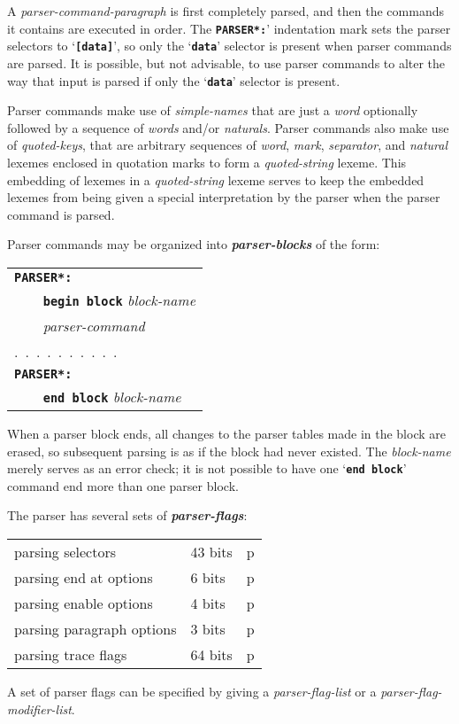 \documentclass[12pt]{article}
\makeatletter
\newcommand{\TT}[1]{{\tt \bfseries #1}}
\newcommand{\skey}[2]{{\bf \em #1#2}\index{#1}}
\newcommand{\emkey}[1]{{\bf \em #1}\index{#1@{\em #1}}}
\newcommand{\pagref}[1]{p\pageref{#1}}
\makeatother
\begin{document}
A {\em parser-command-paragraph} is first completely parsed, and then
the commands it contains are executed in order.
The \TT{*PARSER*:}' indentation mark sets the parser selectors
to `\TT{[data]}', so only the `\TT{data}' selector is present when
parser commands are parsed.  It is possible, but not advisable, to
use parser commands to alter the way that input is parsed if only
the `\TT{data}' selector is present.

Parser commands make use of {\em simple-names} that are just a {\em word}
optionally followed by a sequence of {\em words} and/or {\em naturals}.
Parser commands also make use of
{\em quoted-keys}, that are arbitrary sequences of {\em word},
{\em mark}, {\em separator}, and {\em natural} lexemes enclosed
in quotation marks to form a {\em quoted-string} lexeme.
This embedding of lexemes in a {\em quoted-string} lexeme
serves to keep the embedded lexemes from being given a special
interpretation by the parser when the parser command is parsed.

Parser commands may be organized into \skey{parser-block}s of the form:%
\label{PARSER-BLOCKS}
\begin{center}
\begin{tabular}{l}
\TT{*PARSER*:} \\
\TT{~~~~}\TT{begin block} {\em block-name} \\
\TT{~~~~}{\em parser-command} \\
.~.~.~.~.~.~.~.~.~. \\
\TT{*PARSER*:} \\
\TT{~~~~}\TT{end block} {\em block-name} \\
\end{tabular}
\end{center}

When a parser block ends, all changes to the parser tables made in
the block are erased, so subsequent parsing is as if the block
had never existed.
The {\em block-name} merely serves as an error check; it is
not possible to have one `\TT{end block}' command end more than
one parser block.

The parser has several sets of \emkey{parser-flags}:
\begin{center}
\begin{tabular}{lll}
parsing selectors 	& 43 bits	& \pagref{PARSING-SELECTORS} \\
parsing end at options	& 6 bits	& \pagref{END-AT-OPTIONS} \\
parsing enable options
			& 4 bits	& \pagref{ENABLE-OPTIONS} \\
parsing paragraph options
			& 3 bits	& \pagref{PARAGRAPH-OPTIONS} \\
parsing trace flags	& 64 bits	& \pagref{TRACE-FLAGS} \\
\end{tabular}
\end{center}
A set of parser flags can be
specified by giving a {\em parser-flag-list} or a
{\em parser-flag-modifier-list}.
\end{document}

